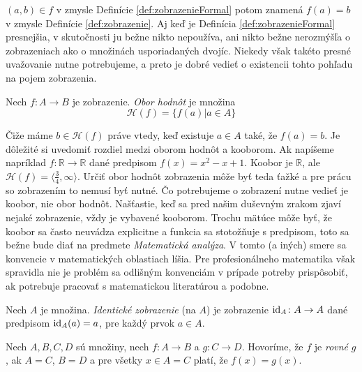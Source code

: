 $(a,b) \in f$ v zmysle Definície \ref{def:zobrazenieFormal} potom znamená $f(a)=b$ v zmysle Definície
\ref{def:zobrazenie}.
Aj keď je Definícia \ref{def:zobrazenieFormal} presnejšia, v skutočnosti ju bežne nikto nepoužíva, ani nikto bežne
nerozmýšľa o zobrazeniach ako o množinách usporiadaných dvojíc.
Niekedy však takéto presné uvažovanie nutne potrebujeme, a preto je dobré vedieť o existencii tohto pohľadu na pojem zobrazenia.

\begin{definition}\label{def:oborHodnot}
Nech $f \colon A \rightarrow B$ je zobrazenie. \emph{Obor hodnôt} je množina
$$ \mathcal{H}(f) = \{f(a) | a \in A\} $$
\end{definition}
Čiže máme $b \in \mathcal{H}(f)$ práve vtedy, keď existuje $a \in A$ také, že $f(a)=b$.
Je dôležité si uvedomiť rozdiel medzi oborom hodnôt a kooborom.
Ak napíšeme napríklad
$f \colon \mathbb{R} \rightarrow \mathbb{R}$ dané predpisom $f(x) = x^2 - x + 1$.
Koobor je $\mathbb{R}$, ale $\mathcal{H}(f) = \langle\frac{3}{4}, \infty\rangle$.
Určiť obor hodnôt zobrazenia môže byť teda ťažké a pre prácu so zobrazením to nemusí
byť nutné.
Čo potrebujeme o zobrazení nutne vedieť je koobor, nie obor hodnôt.
Našťastie, keď sa pred našim duševným zrakom zjaví nejaké zobrazenie, vždy je
vybavené kooborom.
Trochu mätúce môže byť, že koobor sa často neuvádza explicitne a
funkcia sa stotožňuje s predpisom, toto sa bežne bude diať na predmete
\emph{Matematická analýza}.
V tomto (a iných) smere sa konvencie v matematických
oblastiach líšia.
Pre profesionálneho matematika však spravidla nie je problém sa
odlišným konvenciám v prípade potreby prispôsobiť, ak potrebuje pracovať s
matematickou literatúrou a podobne.
\begin{definition}\label{def:identickeZobrazenie}
Nech $A$ je množina. \emph{Identické zobrazenie} (na $A$) je zobrazenie $\mathrm{id}_A \colon A \rightarrow A$ dané predpisom $\mathrm{id}_A(a) = a$, pre každý prvok $a \in A$.
\end{definition}

\begin{definition}\label{def:rovnostZobrazeni}
Nech $A, B, C, D$ sú množiny, nech $f \colon A \rightarrow B$ a $g \colon C \rightarrow D$.
Hovoríme, že $f$ je \emph{rovné} $g$, ak $A=C$, $B=D$ a pre všetky $x \in A=C$ platí, že $f(x)=g(x)$.
\end{definition}

